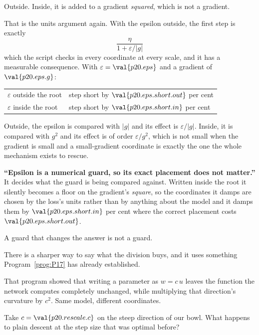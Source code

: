 \begin{fr}
\begin{ansblock}
Outside. Inside, it is added to a gradient \emph{squared}, which is not a
gradient.
\end{ansblock}

That is the units argument again. With the epsilon outside, the first step is
exactly
\[ \frac{\eta}{1 + \varepsilon/\lvert g\rvert} \]
which the script checks in every coordinate at every scale, and it has a
measurable consequence. With $\varepsilon = \val{p20.eps}$ and a gradient of
$\val{p20.eps.g}$:

\begin{center}
\begin{tabular}{ll}
\toprule
$\varepsilon$ outside the root & step short by $\val{p20.eps.short.out}$ per cent \\
$\varepsilon$ inside the root & step short by $\val{p20.eps.short.in}$ per cent \\
\bottomrule
\end{tabular}
\end{center}

Outside, the epsilon is compared with $\lvert g \rvert$ and its effect is
$\varepsilon/\lvert g\rvert$. Inside, it is compared with $g^{2}$ and its
effect is of order $\varepsilon/g^{2}$, which is not small when the gradient is
small \dash{} and a small-gradient coordinate is exactly the one the whole
mechanism exists to rescue.
\end{fr}

\begin{fr}
\begin{trapbox}
\textbf{\enquote{Epsilon is a numerical guard, so its exact placement does not
matter.}} It decides what the guard is being compared against. Written inside
the root it silently becomes a floor on the gradient's \emph{square}, so the
coordinates it damps are chosen by the loss's units rather than by anything
about the model \dash{} and it damps them by
$\val{p20.eps.short.in}$ per cent where the correct placement costs
$\val{p20.eps.short.out}$.

A guard that changes the answer is not a guard.
\end{trapbox}
\end{fr}

\begin{fr}
There is a sharper way to say what the division buys, and it uses something
Program~\ref{prog:P17} has already established.

That program showed that writing a parameter as $w = c\,u$ leaves the function
the network computes completely unchanged, while multiplying that direction's
curvature by $c^{2}$. Same model, different coordinates.

Take $c = \val{p20.rescale.c}$ on the steep direction of our bowl. What happens
to plain descent at the step size that was optimal before?
\nextframe
\end{fr}

